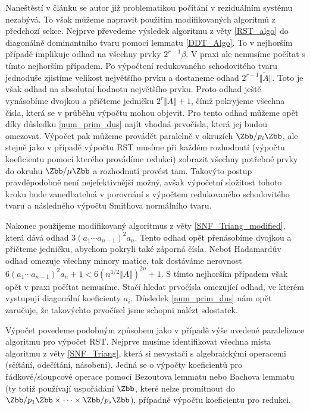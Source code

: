 Naneštěstí v článku \cite{SNF_Arne} se autor již problematikou počítání v
reziduálním systému nezabývá. To však můžeme napravit použitím modifikovaných
algoritmů z předchozí sekce. Nejprve převedeme výsledek algoritmu z věty 
\ref{RST_algo} do diagonálně dominantního tvaru pomocí lemmatu \ref{DDT_Algo}.
To v nejhorším případě implikuje odhad na všechny prvky $ 2^{r - 1} \beta $.
V praxi ale nemusíme počítat s tímto nejhorším případem. Po výpočtení 
redukovaného schodovitého tvaru jednoduše zjistíme velikost největšího prvku 
a dostaneme odhad $ 2^{r - 1} \Vert \tilde{A} \Vert $. Toto je však odhad na 
absolutní hodnotu největšího prvku. Proto odhad ještě vynásobíme dvojkou a 
přičteme jedničku $ 2^r \Vert A \Vert + 1 $, čímž pokryjeme všechna čísla, 
která se v průběhu výpočtu mohou objevit. Pro tento odhad můžeme opět díky 
důsledku \ref{num_prim_dus} najít vhodná prvočísla, která jej budou omezovat.
Výpočet pak můžeme provádět paralelně v okruzích $ \Zbb / p_i \Zbb $, ale stejně
jako v případě výpočtu RST musíme při každém rozhodnutí (výpočtu koeficientu
pomocí kterého provádíme redukci) zobrazit všechny potřebné prvky do okruhu
$ \Zbb / \mu \Zbb $ a rozhodnutí provést tam. Takovýto postup pravděpodobně není
nejefektivnější možný, avšak výpočetní složitost tohoto kroku bude zanedbatelná
v porovnání s výpočtem redukovaného schodovitého tvaru a následného výpočtu 
Smithova normálního tvaru.

Nakonec použijeme modifikovaný algoritmus z věty \ref{SNF_Triang_modified}, 
která dává odhad $ 3 (a_1 \cdots a_{n - 1})^2 a_n $. Tento odhad opět přenásobíme
dvojkou a přičteme jedničku, abychom pokryli také záporná čísla. Neboť 
Hadamardův odhad omezuje všechny minory matice, tak dostáváme nerovnost
$ 6 (a_1 \cdots a_{n - 1})^2 a_n + 1 < 6 (n^{1/2} \Vert A \Vert)^{2 n} + 1 $. S 
tímto nejhorším případem však opět v praxi počítat nemusíme. Stačí hledat 
prvočísla omezující odhad, ve kterém vystupují diagonální koeficienty $ a_i $.
Důsledek \ref{num_prim_dus} nám opět zaručuje, že takovýchto prvočísel jsme 
schopni nalézt sdostatek.

Výpočet povedeme podobným způsobem jako v případě výše uvedené paralelizace 
algoritmu pro výpočet RST. 
Nejprve musíme identifikovat všechna místa algoritmu z věty \ref{SNF_Triang},
která si nevystačí s algebraickými operacemi (sčítání, odečítání, násobení). 
Jedná se o výpočty koeficientů pro řádkové/sloupcové operace
pomocí Bezoutova lemmatu nebo Bachova lemmatu (ty totiž používají
uspořádání $\Zbb$, které nelze promítnout do $\Zbb / p_1 \Zbb \times
\cdots \times \Zbb / p_s \Zbb$), případně výpočtu koeficientu pro redukci.

